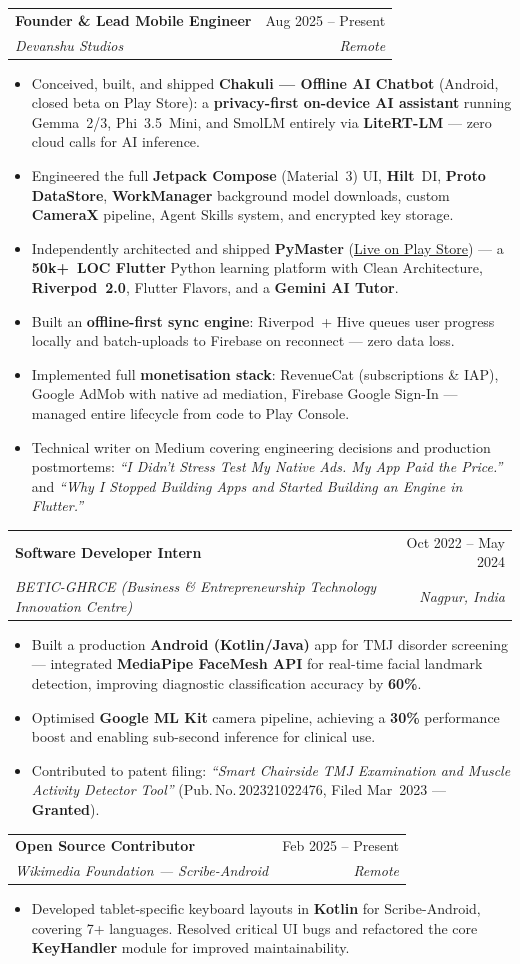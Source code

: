 \documentclass[letterpaper,11pt]{article}
\makeatletter
\newcommand{\pnum}[1]{Pub.\,No.\,#1}
\newcommand{\resumeItem}[1]{\item\small{#1}}
\newcommand{\resumeSubheading}[4]{
  \vspace{-1pt}\item
    \begin{tabular*}{0.97\textwidth}[t]{l@{\extracolsep{\fill}}r}
      \textbf{#1} & \small #2 \\
      \textit{\small #3} & \textit{\small #4} \\
    \end{tabular*}\vspace{-5pt}
}
\newcommand{\resumeItemListStart}{
  \begin{itemize}[leftmargin=0.20in, itemsep=1pt, parsep=0pt, topsep=2pt]
}
\newcommand{\resumeItemListEnd}{\end{itemize}\vspace{2pt}}
\makeatother
\begin{document}
  \resumeSubheading
    {Founder \& Lead Mobile Engineer}{Aug 2025 -- Present}
    {Devanshu Studios}{Remote}
    \resumeItemListStart
      \resumeItem{Conceived, built, and shipped \textbf{Chakuli — Offline AI Chatbot} (Android, closed beta on Play Store): a \textbf{privacy-first on-device AI assistant} running Gemma~2/3, Phi~3.5~Mini, and SmolLM entirely via \textbf{LiteRT-LM} — zero cloud calls for AI inference.}
      \resumeItem{Engineered the full \textbf{Jetpack Compose} (Material~3) UI, \textbf{Hilt}~DI, \textbf{Proto DataStore}, \textbf{WorkManager} background model downloads, custom \textbf{CameraX} pipeline, Agent Skills system, and encrypted key storage.}
      \resumeItem{Independently architected and shipped \textbf{PyMaster} (\href{https://play.google.com/store/apps/details?id=com.devanshustudios.pymaster}{\underline{Live on Play Store}}) — a \textbf{50k+~LOC Flutter} Python learning platform with Clean Architecture, \textbf{Riverpod~2.0}, Flutter Flavors, and a \textbf{Gemini AI Tutor}.}
      \resumeItem{Built an \textbf{offline-first sync engine}: Riverpod~+ Hive queues user progress locally and batch-uploads to Firebase on reconnect — zero data loss.}
      \resumeItem{Implemented full \textbf{monetisation stack}: RevenueCat (subscriptions \& IAP), Google AdMob with native ad mediation, Firebase Google Sign-In — managed entire lifecycle from code to Play Console.}
      \resumeItem{Technical writer on Medium covering engineering decisions and production postmortems: \textit{``I Didn't Stress Test My Native Ads. My App Paid the Price.''} and \textit{``Why I Stopped Building Apps and Started Building an Engine in Flutter.''}}
    \resumeItemListEnd

  \resumeSubheading
    {Software Developer Intern}{Oct 2022 -- May 2024}
    {BETIC-GHRCE (Business \& Entrepreneurship Technology Innovation Centre)}{Nagpur, India}
    \resumeItemListStart
      \resumeItem{Built a production \textbf{Android (Kotlin/Java)} app for TMJ disorder screening — integrated \textbf{MediaPipe FaceMesh API} for real-time facial landmark detection, improving diagnostic classification accuracy by \textbf{60\%}.}
      \resumeItem{Optimised \textbf{Google ML Kit} camera pipeline, achieving a \textbf{30\%} performance boost and enabling sub-second inference for clinical use.}
      \resumeItem{Contributed to patent filing: \textit{``Smart Chairside TMJ Examination and Muscle Activity Detector Tool''} (\pnum{202321022476}, Filed Mar~2023 — \textbf{Granted}).}
    \resumeItemListEnd

  \resumeSubheading
    {Open Source Contributor}{Feb 2025 -- Present}
    {Wikimedia Foundation — Scribe-Android}{Remote}
    \resumeItemListStart
      \resumeItem{Developed tablet-specific keyboard layouts in \textbf{Kotlin} for Scribe-Android, covering 7+ languages. Resolved critical UI bugs and refactored the core \textbf{KeyHandler} module for improved maintainability.}
    \resumeItemListEnd
\end{document}
